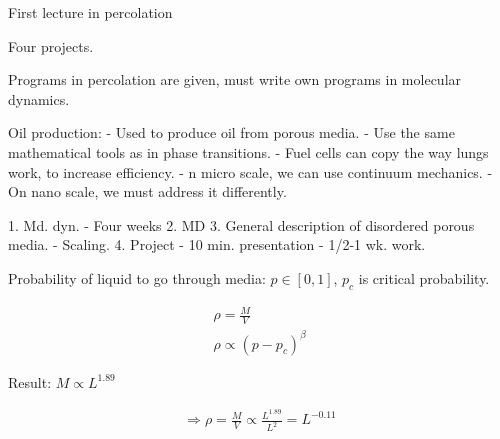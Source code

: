 \documentclass{article}[12pt]
\newcommand{\eq}[1]{\begin{align*}#1\end{align*}}
\begin{document}
First lecture in percolation

Four projects.

Programs in percolation are given, 
must write own programs in molecular dynamics.

Oil production:
  - Used to produce oil from porous media.
    - Use the same mathematical tools as in phase transitions.
    - Fuel cells can copy the way lungs work, to increase efficiency.
    - n micro scale, we can use continuum mechanics.
    - On nano scale, we must address it differently.

1. Md. dyn.
  - Four weeks
2. MD
3. General description of disordered porous media.
  - Scaling.
4. Project
  - 10 min. presentation
  - 1/2-1 wk. work.

Probability of liquid to go through media: $p \in [0,1]$, 
$p_c$ is critical probability.


\eq{
  \rho = \frac{M}{V}\\
  \rho \propto (p-p_c)^{\beta}
}

Result: $M \propto L^{1.89}$

\eq{
  \Rightarrow \rho = \frac{M}{V} \propto \frac{L^{1.89}}{L^2} = L^{-0.11}
}
\end{document}
